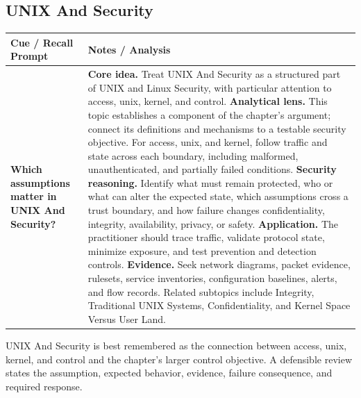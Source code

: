 \documentclass[11pt]{article}
\newcommand{\CornellHeader}{%
\rowcolor{Navy}\color{white}\bfseries Cue / Recall Prompt & \color{white}\bfseries Notes / Analysis\\\hline}
\newcommand{\CornellRow}[2]{%
\cellcolor{CueGray}\RaggedRight\textbf{#1} & \RaggedRight #2\\\hline}
\begin{document}
\subsection*{UNIX And Security}
\begin{longtable}{>{\RaggedRight\arraybackslash}p{}|>{\RaggedRight\arraybackslash}p{}}
\CornellHeader
\CornellRow{Which assumptions matter in UNIX And Security?}{\textbf{Core idea.} Treat UNIX And Security as a structured part of UNIX and Linux Security, with particular attention to access, unix, kernel, and control. \textbf{Analytical lens.} This topic establishes a component of the chapter's argument; connect its definitions and mechanisms to a testable security objective. For access, unix, and kernel, follow traffic and state across each boundary, including malformed, unauthenticated, and partially failed conditions. \textbf{Security reasoning.} Identify what must remain protected, who or what can alter the expected state, which assumptions cross a trust boundary, and how failure changes confidentiality, integrity, availability, privacy, or safety. \textbf{Application.} The practitioner should trace traffic, validate protocol state, minimize exposure, and test prevention and detection controls. \textbf{Evidence.} Seek network diagrams, packet evidence, rulesets, service inventories, configuration baselines, alerts, and flow records. Related subtopics include Integrity, Traditional UNIX Systems, Confidentiality, and Kernel Space Versus User Land.}
\end{longtable}
\begin{topicsummary}
UNIX And Security is best remembered as the connection between access, unix, kernel, and control and the chapter's larger control objective. A defensible review states the assumption, expected behavior, evidence, failure consequence, and required response.
\end{topicsummary}
\end{document}
